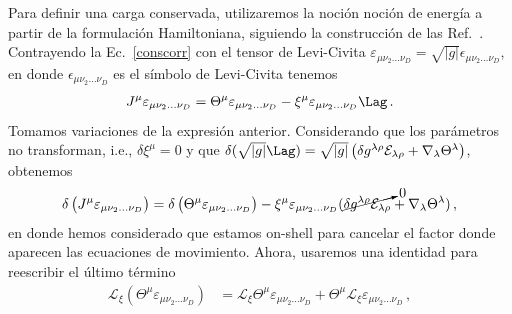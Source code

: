 \documentclass[../Main.tex]{subfiles}
\begin{document}

Para definir una carga conservada, utilizaremos la noción noción de energía a partir de la formulación Hamiltoniana, siguiendo la construcción de las Ref.~\cite{arnold1989mathematical,Lee1990LocalSA,Corichi:2018drc,Crnkovic:1986ex}. Contrayendo la Ec.~\eqref{conscorr} con el tensor de Levi-Civita $\varepsilon_{\mu \nu_2 \ldots \nu_D}=\sqrt{|g|}\epsilon_{\mu \nu_2 \ldots \nu_D}$, en donde $\epsilon_{\mu \nu_2 \ldots \nu_D}$ es el símbolo de Levi-Civita tenemos
\begin{align}
J^\mu \varepsilon_{\mu \nu_2 \ldots \nu_D}=\Theta^\mu \varepsilon_{\mu \nu_2 \ldots \nu_D}-\xi^\mu \varepsilon_{\mu \nu_2 \ldots \nu_D} \Lag \, .
\end{align}
Tomamos variaciones de la expresión anterior. Considerando que los parámetros no transforman, i.e., $\delta \xi^\mu=0$ y que $\delta(\sqrt{|g|}\Lag)= \sqrt{|g|}\left(\delta g^{\lambda \rho} \mathcal{E}_{\lambda \rho}+\nabla_\lambda \Theta^\lambda\right)$, obtenemos
\begin{align}
\delta\left(J^\mu \varepsilon_{\mu \nu_2 \ldots \nu_D}\right)=\delta\left(\Theta^\mu \varepsilon_{\mu \nu_2 \ldots \nu_D}\right)-\xi^\mu \varepsilon_{\mu \nu_2 \ldots\nu_D}(\cancelto{0}{\delta g^{\lambda\rho}\mathcal{E}_{\lambda\rho}}+\nabla_\lambda \Theta^\lambda)\, , \label{varcorri}
\end{align}
en donde hemos considerado que estamos on-shell para cancelar el factor donde aparecen las ecuaciones de movimiento. Ahora, usaremos una identidad para reescribir el último término
\begin{align}
\mathcal{L}_{\xi}\left(\Theta^\mu \varepsilon_{\mu \nu_2 \ldots \nu_D}\right)&=\mathcal{L}_{\xi} \Theta^\mu \varepsilon_{\mu \nu_2 \ldots \nu_D}+\Theta^\mu \mathcal{L}_{\xi} \varepsilon_{\mu \nu_2 \ldots \nu_D}\, ,
\end{align}
\end{document}
